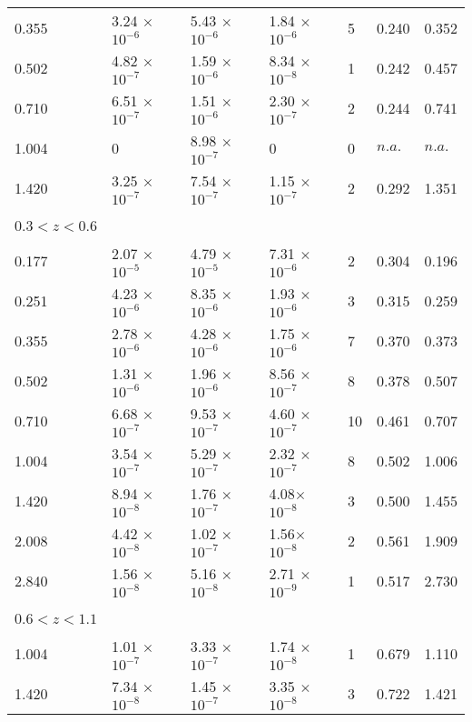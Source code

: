 \begin{tabular}{lllllll}
0.355 & 3.24 $\times$ $10^{-6}$ & 5.43 $\times$ $10^{-6}$ & 1.84 $\times$ $10^{-6}$ & 5 & 0.240	& 0.352 \\
0.502 & 4.82 $\times$ $10^{-7}$ & 1.59 $\times$ $10^{-6}$ & 8.34 $\times$ $10^{-8}$  & 1 & 0.242	& 0.457 \\
0.710 & 6.51 $\times$ $10^{-7}$ & 1.51 $\times$ $10^{-6}$ & 2.30 $\times$ $10^{-7}$  & 2 & 0.244	& 0.741 \\
1.004 & 0	& 8.98 $\times$ $10^{-7}$ & 0 & 0 & $n.a.$ & $n.a.$ \\
1.420 & 3.25 $\times$ $10^{-7}$ & 7.54 $\times$ $10^{-7}$ & 1.15 $\times$ $10^{-7}$  & 2 & 0.292 & 1.351 \\
\\ \hline
\\
$0.3<z<0.6$ \\
\\
0.177 & 2.07 $\times$ $10^{-5}$  &	4.79 $\times$ $10^{-5}$  & 7.31 $\times$ $10^{-6}$  & 2 & 0.304 & 0.196 \\
0.251 & 4.23 $\times$ $10^{-6}$  &	8.35 $\times$ $10^{-6}$  & 1.93 $\times$ $10^{-6}$ 	 & 3 & 0.315 & 0.259 \\
0.355 & 2.78 $\times$ $10^{-6}$  &	4.28 $\times$ $10^{-6}$  & 1.75 $\times$ $10^{-6}$ 	 & 7 & 0.370 &	0.373 \\
0.502 & 1.31 $\times$ $10^{-6}$  &	1.96 $\times$ $10^{-6}$  & 8.56 $\times$ $10^{-7}$  & 8 & 0.378 & 0.507 \\ 
0.710 & 6.68 $\times$ $10^{-7}$  &	9.53 $\times$ $10^{-7}$  & 4.60 $\times$ $10^{-7}$ 	 & 10 & 0.461 & 0.707 \\
1.004 & 3.54 $\times$ $10^{-7}$  &	5.29 $\times$ $10^{-7}$  & 2.32 $\times$ $10^{-7}$ 	 & 8 & 0.502 & 1.006 \\
1.420 & 8.94 $\times$ $10^{-8}$  &	1.76 $\times$ $10^{-7}$  & 4.08$\times$ $10^{-8}$ 	 &  3	& 0.500 &	1.455 \\
2.008 & 4.42 $\times$ $10^{-8}$  &	1.02 $\times$ $10^{-7}$  & 1.56$\times$ $10^{-8}$ 	 & 2	& 0.561 &	1.909 \\
2.840 & 1.56 $\times$ $10^{-8}$  &	5.16 $\times$ $10^{-8}$  & 2.71 $\times$ $10^{-9}$ 	 & 1	& 0.517 &	2.730 \\
\\ \hline
\\
$0.6<z<1.1$ \\
\\
1.004 & 1.01 $\times$ $10^{-7}$  & 3.33 $\times$ $10^{-7}$  & 1.74 $\times$ $10^{-8}$  & 1 & 0.679 & 1.110 \\
1.420 & 7.34 $\times$ $10^{-8}$ 	& 1.45 $\times$ $10^{-7}$  & 3.35 $\times$ $10^{-8}$  & 3 & 0.722 & 1.421 \\

\end{tabular}
